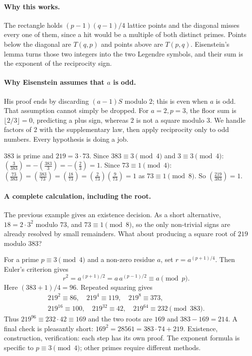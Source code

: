 \paragraph{Why this works.}
The rectangle holds $(p-1)(q-1)/4$ lattice points and the diagonal misses every one of them, since a hit would be a multiple of both distinct primes. Points below the diagonal are $T(q,p)$ and points above are $T(p,q)$. Eisenstein's lemma turns those two integers into the two Legendre symbols, and their sum is the exponent of the reciprocity sign.

\paragraph{Why Eisenstein assumes that $a$ is odd.}
His proof ends by discarding $(a-1)S$ modulo $2$; this is even when $a$ is
odd. That assumption cannot simply be dropped. For $a=2,p=3$, the floor sum
is $\lfloor2/3\rfloor=0$, predicting a plus sign, whereas $2$ is not a square
modulo $3$. We handle factors of $2$ with the supplementary law, then apply
reciprocity only to odd numbers. Every hypothesis is doing a job.

\begin{example}
$383$ is prime and $219=3\cdot73$. Since $383\equiv3\pmod4$ and $3\equiv3\pmod4$: $\left(\frac3{383}\right)=-\left(\frac{383}3\right)=-\left(\frac23\right)=1$. Since $73\equiv1\pmod4$: $\left(\frac{73}{383}\right)=\left(\frac{383}{73}\right)=\left(\frac{18}{73}\right)=\left(\frac2{73}\right)\left(\frac9{73}\right)=1$ as $73\equiv1\pmod8$. So $\left(\frac{219}{383}\right)=1$.
\end{example}

\paragraph{A complete calculation, including the root.}
The previous example gives an existence decision. As a short alternative,
$18=2\cdot3^2$ modulo $73$, and $73\equiv1\pmod8$, so the only non-trivial
signs are already resolved by small remainders. What about producing a square
root of $219$ modulo $383$?

For a prime $p\equiv3\pmod4$ and a non-zero residue $a$, set
$r=a^{(p+1)/4}$. Then Euler's criterion gives
\[
 r^2=a^{(p+1)/2}=a\,a^{(p-1)/2}\equiv a\pmod p.
\]
Here $(383+1)/4=96$. Repeated squaring gives
\[
\begin{gathered}
219^2\equiv86,\quad219^4\equiv119,\quad219^8\equiv373,\\
219^{16}\equiv100,\quad219^{32}\equiv42,\quad219^{64}\equiv232
\pmod{383}.
\end{gathered}
\]
Thus $219^{96}\equiv232\cdot42\equiv169$ and the two roots are $169$ and
$383-169=214$. A final check is pleasantly short:
$169^2=28561=383\cdot74+219$. Existence, construction, verification:
each step has its own proof. The exponent formula is specific to
$p\equiv3\pmod4$; other primes require different methods.

